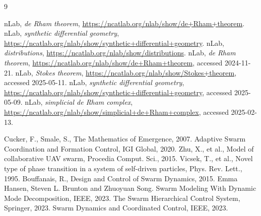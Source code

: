 \documentclass{article}
\theoremstyle{plain}
\begin{document}
\begin{thebibliography}{9}

 nLab, \emph{de Rham theorem}, \url{https://ncatlab.org/nlab/show/de+Rham+theorem}.
 nLab, \emph{synthetic differential geometry}, \url{https://ncatlab.org/nlab/show/synthetic+differential+geometry}.
 nLab, \emph{distributions}, \url{https://ncatlab.org/nlab/show/distributions}.
 nLab, \emph{de Rham theorem}, \url{https://ncatlab.org/nlab/show/de+Rham+theorem}, accessed 2024-11-21.
 nLab, \emph{Stokes theorem}, \url{https://ncatlab.org/nlab/show/Stokes+theorem}, accessed 2025-05-11.
 nLab, \emph{synthetic differential geometry}, \url{https://ncatlab.org/nlab/show/synthetic+differential+geometry}, accessed 2025-05-09.
 nLab, \emph{simplicial de Rham complex}, \url{https://ncatlab.org/nlab/show/simplicial+de+Rham+complex}, accessed 2025-02-13.

 Cucker, F., Smale, S., The Mathematics of Emergence, 2007.
 Adaptive Swarm Coordination and Formation Control, IGI Global, 2020.
 Zhu, X., et al., Model of collaborative UAV swarm, Procedia Comput. Sci., 2015.
 Vicsek, T., et al., Novel type of phase transition in a system of self-driven particles, Phys. Rev. Lett., 1995.
 Bouffanais, R., Design and Control of Swarm Dynamics, 2015.
 Emma Hansen, Steven L. Brunton and Zhuoyuan Song. Swarm Modeling With Dynamic Mode Decomposition, IEEE, 2023.
 The Swarm Hierarchical Control System, Springer, 2023.
 Swarm Dynamics and Coordinated Control, IEEE, 2023.

\end{thebibliography}
\end{document}
